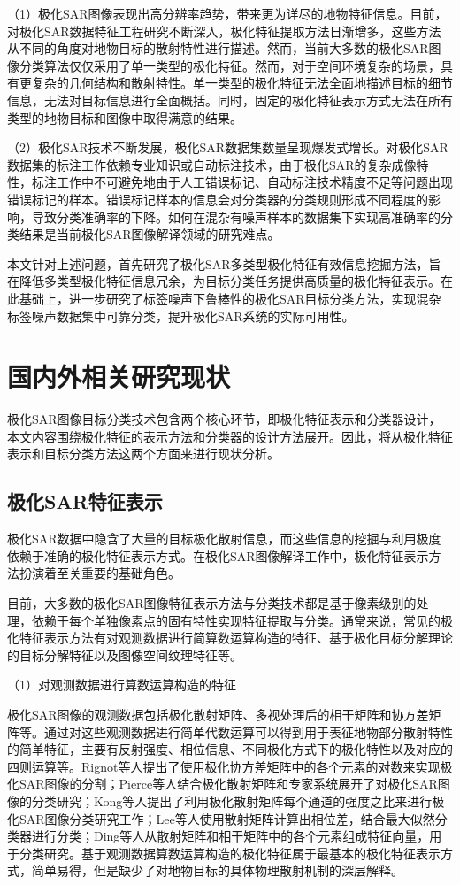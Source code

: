 （1）极化SAR图像表现出高分辨率趋势，带来更为详尽的地物特征信息。目前，对极化SAR数据特征工程研究不断深入，极化特征提取方法日渐增多，这些方法从不同的角度对地物目标的散射特性进行描述。然而，当前大多数的极化SAR图像分类算法仅仅采用了单一类型的极化特征。然而，对于空间环境复杂的场景，具有更复杂的几何结构和散射特性。单一类型的极化特征无法全面地描述目标的细节信息，无法对目标信息进行全面概括。同时，固定的极化特征表示方式无法在所有类型的地物目标和图像中取得满意的结果。

（2）极化SAR技术不断发展，极化SAR数据集数量呈现爆发式增长。对极化SAR数据集的标注工作依赖专业知识或自动标注技术，由于极化SAR的复杂成像特性，标注工作中不可避免地由于人工错误标记、自动标注技术精度不足等问题出现错误标记的样本。错误标记样本的信息会对分类器的分类规则形成不同程度的影响，导致分类准确率的下降。如何在混杂有噪声样本的数据集下实现高准确率的分类结果是当前极化SAR图像解译领域的研究难点。

本文针对上述问题，首先研究了极化SAR多类型极化特征有效信息挖掘方法，旨在降低多类型极化特征信息冗余，为目标分类任务提供高质量的极化特征表示。在此基础上，进一步研究了标签噪声下鲁棒性的极化SAR目标分类方法，实现混杂标签噪声数据集中可靠分类，提升极化SAR系统的实际可用性。

\section{国内外相关研究现状}
极化SAR图像目标分类技术包含两个核心环节，即极化特征表示和分类器设计，本文内容围绕极化特征的表示方法和分类器的设计方法展开。因此，将从极化特征表示和目标分类方法这两个方面来进行现状分析。

\subsection{极化SAR特征表示}
极化SAR数据中隐含了大量的目标极化散射信息，而这些信息的挖掘与利用极度依赖于准确的极化特征表示方式。在极化SAR图像解译工作中，极化特征表示方法扮演着至关重要的基础角色。

目前，大多数的极化SAR图像特征表示方法与分类技术都是基于像素级别的处理，依赖于每个单独像素点的固有特性实现特征提取与分类。通常来说，常见的极化特征表示方法有对观测数据进行简算数运算构造的特征、基于极化目标分解理论的目标分解特征以及图像空间纹理特征等。

（1）对观测数据进行算数运算构造的特征

极化SAR图像的观测数据包括极化散射矩阵、多视处理后的相干矩阵和协方差矩阵等。通过对这些观测数据进行简单代数运算可以得到用于表征地物部分散射特性的简单特征，主要有反射强度、相位信息、不同极化方式下的极化特性以及对应的四则运算等。Rignot等人提出了使用极化协方差矩阵中的各个元素的对数来实现极化SAR图像的分割；Pierce等人结合极化散射矩阵和专家系统展开了对极化SAR图像的分类研究；Kong等人提出了利用极化散射矩阵每个通道的强度之比来进行极化SAR图像分类研究工作；Lee等人使用散射矩阵计算出相位差，结合最大似然分类器进行分类；Ding等人从散射矩阵和相干矩阵中的各个元素组成特征向量，用于分类研究。基于观测数据算数运算构造的极化特征属于最基本的极化特征表示方式，简单易得，但是缺少了对地物目标的具体物理散射机制的深层解释。

